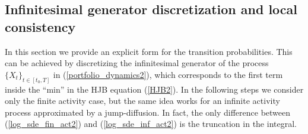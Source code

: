 \subsection{Infinitesimal generator discretization and local consistency}\label{Markov_Chain2}

In this section we provide an explicit form for the 
transition probabilities. This can be achieved by discretizing the infinitesimal generator of the process $\{X_t\}_{t\in[t_0,T]}$ in (\ref{portfolio_dynamics2}),
which corresponds to the first term inside the ``min'' in the HJB equation (\ref{HJB2}). 
In the following steps we consider only the finite activity case, but the same idea works for an infinite activity process approximated by 
a jump-diffusion.  
In fact, the only difference between (\ref{log_sde_fin_act2}) and (\ref{log_sde_inf_act2}) is the truncation in the integral.

